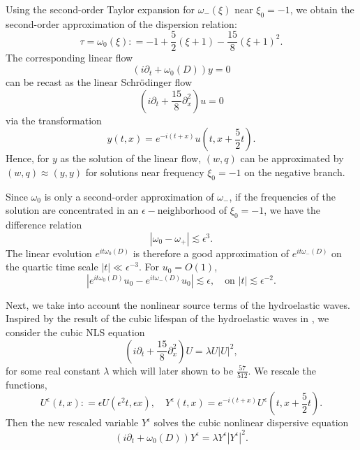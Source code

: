 \documentclass[12pt]{amsart}
\theoremstyle{remark}
\theoremstyle{definition}
\numberwithin{equation}{section}
\newcommand{\p}{\partial}
\begin{document}
Using the second-order Taylor expansion for $\omega_-(\xi)$ near $\xi_0 = -1$, we obtain the second-order approximation of the dispersion relation:
\begin{equation*}
    \tau = \omega_0(\xi) : = -1 + \frac{5}{2}(\xi+1) - \frac{15}{8}(\xi+1)^2.
\end{equation*}
The corresponding linear flow
\begin{equation*}
 (i\partial_t + \omega_0(D))y = 0
\end{equation*}
can be recast as the linear Schr\"odinger flow
\begin{equation} \label{LinearSchrodinger}
\left(i\partial_t + \frac{15}{8}\p_x^2 \right) u = 0
\end{equation}
via the transformation 
\begin{equation*}
    y(t,x) = e^{-i(t+x)}u\left(t, x+ \frac{5}{2}t \right).
\end{equation*}
Hence, for $y$ as the solution of the linear flow, $(w, q)$ can be approximated by $(w,q) \approx (y,y)$ for solutions near frequency $\xi_0 =-1$ on the negative branch.

Since $\omega_0$ is only a second-order approximation of $\omega_-$, if the frequencies of the solution are concentrated in an $\epsilon-$neighborhood of $\xi_0 = -1$, we have the difference relation 
\begin{equation*}
    |\omega_0 - \omega_+|\lesssim \epsilon^3.
\end{equation*}
The linear evolution $e^{it\omega_0(D)}$ is therefore a good approximation of $e^{it \omega_-(D)}$ on the quartic time scale $|t|\ll \epsilon^{-3}$.
For $u_0 = O(1)$, 
\begin{equation*}
    |e^{it\omega_0(D)} u_0 - e^{it \omega_-(D)} u_0| \lesssim \epsilon, \quad \text{on } |t|\lesssim \epsilon^{-2}.
\end{equation*}

Next, we take into account the nonlinear source terms of the hydroelastic waves.
Inspired by the result of the cubic lifespan of the hydroelastic waves in \cite{MR4846707}, we consider the cubic NLS equation
\begin{equation} \label{CubicNls}
 \left(i\partial_t + \frac{15}{8}\partial_x^2 \right) U = \lambda U|U|^2,
\end{equation}
for some real constant $\lambda$ which will later shown to be $\frac{57}{512}$.
We rescale the functions,
\begin{equation} \label{YURelation}
 U^{\epsilon}(t,x) : = \epsilon U(\epsilon^2 t, \epsilon x), \quad  Y^\epsilon(t,x) = e^{-i(t+x)}U^{\epsilon}\left(t, x+ \frac{5}{2}t \right).
\end{equation}
Then the new rescaled variable $Y^\epsilon$ solves the cubic nonlinear dispersive equation
\begin{equation} \label{CubicEpsilonDispersive}
 (i\partial_t + \omega_0(D))Y^\epsilon = \lambda Y^\epsilon |Y^\epsilon|^2.   
\end{equation}
\end{document}
